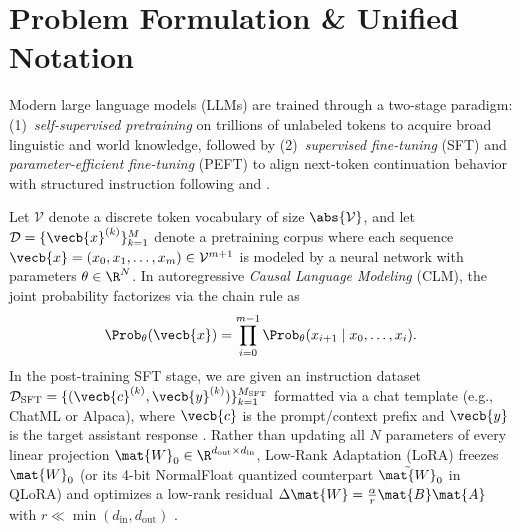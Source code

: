 \documentclass[../../../../master.tex]{subfiles}
\begin{document}

\section{Problem Formulation \& Unified Notation}
\label{sec:pretrain:formulation}

Modern large language models (LLMs) are trained through a two-stage paradigm: (1)~\emph{self-supervised pretraining} on trillions of unlabeled tokens to acquire broad linguistic and world knowledge, followed by (2)~\emph{supervised fine-tuning} (SFT) and \emph{parameter-efficient fine-tuning} (PEFT) to align next-token continuation behavior with structured instruction following  and .

Let $\mathcal{V}$ denote a discrete token vocabulary of size $\abs{\mathcal{V}}$, and let $\mathcal{D} = \{\vecb{x}^{(k)}\}_{k=1}^{M}$ denote a pretraining corpus where each sequence $\vecb{x} = (x_0, x_1, \dots, x_m) \in \mathcal{V}^{m+1}$ is modeled by a neural network with parameters $\theta \in \R^N$. In autoregressive \emph{Causal Language Modeling} (CLM), the joint probability factorizes via the chain rule as
\begin{equation}
  \Prob_\theta(\vecb{x}) = \prod_{i=0}^{m-1} \Prob_\theta(x_{i+1} \mid x_0, \dots, x_i).
  \label{eq:pretrain:clm_factorization}
\end{equation}
In the post-training SFT stage, we are given an instruction dataset $\mathcal{D}_{\text{SFT}} = \{(\vecb{c}^{(k)}, \vecb{y}^{(k)})\}_{k=1}^{M_{\text{SFT}}}$ formatted via a chat template (e.g., ChatML or Alpaca), where $\vecb{c}$ is the prompt/context prefix and $\vecb{y}$ is the target assistant response  . Rather than updating all $N$ parameters of every linear projection $\mat{W}_0 \in \R^{d_{\text{out}} \times d_{\text{in}}}$, Low-Rank Adaptation (LoRA) freezes $\mat{W}_0$ (or its 4-bit NormalFloat quantized counterpart $\tilde{\mat{W}}_0$ in QLoRA) and optimizes a low-rank residual $\Delta \mat{W} = \frac{\alpha}{r}\mat{B}\mat{A}$ with $r \ll \min(d_{\text{in}}, d_{\text{out}})$  .
\end{document}

